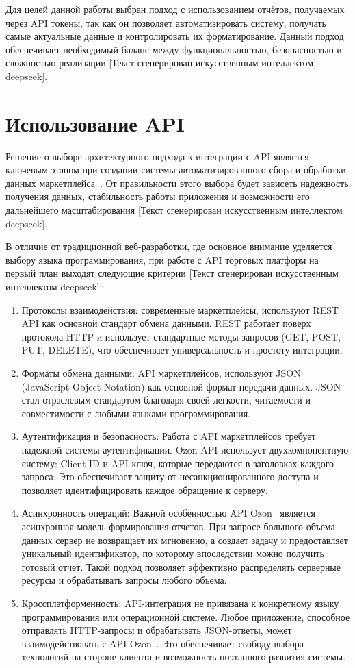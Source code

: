 Для целей данной работы выбран подход с использованием отчётов, получаемых через API токены, так как он позволяет автоматизировать систему, получать самые актуальные данные и контролировать их форматирование. Данный подход обеспечивает необходимый баланс между функциональностью, безопасностью и сложностью реализации [Текст сгенерирован искусственным интеллектом deepseek].

\section{Использование API}
Решение о выборе архитектурного подхода к интеграции с API является ключевым этапом при создании системы автоматизированного сбора и обработки данных маркетплейса~\cite{ozonapiAsync}. От правильности этого выбора будет зависеть надежность получения данных, стабильность работы приложения и возможности его дальнейшего масштабирования [Текст сгенерирован искусственным интеллектом deepseek].

В отличие от традиционной веб-разработки, где основное внимание уделяется выбору языка программирования, при работе с API торговых платформ на первый план выходят следующие критерии [Текст сгенерирован искусственным интеллектом deepseek]:
\begin{enumerate}
    \item Протоколы взаимодействия: современные маркетплейсы, используют REST API как основной стандарт обмена данными. REST работает поверх протокола HTTP и использует стандартные методы запросов (GET, POST, PUT, DELETE), что обеспечивает универсальность и простоту интеграции.
    \item Форматы обмена данными: API маркетплейсов, используют JSON (JavaScript Object Notation) как основной формат передачи данных. JSON стал отраслевым стандартом благодаря своей легкости, читаемости и совместимости с любыми языками программирования.
    \item Аутентификация и безопасность: Работа с API маркетплейсов требует надежной системы аутентификации. Ozon API использует двухкомпонентную систему: Client-ID и API-ключ, которые передаются в заголовках каждого запроса. Это обеспечивает защиту от несанкционированного доступа и позволяет идентифицировать каждое обращение к серверу.
    \item Асинхронность операций: Важной особенностью API Ozon~\cite{ozonapiAsync} является асинхронная модель формирования отчетов. При запросе большого объема данных сервер не возвращает их мгновенно, а создает задачу и предоставляет уникальный идентификатор, по которому впоследствии можно получить готовый отчет. Такой подход позволяет эффективно распределять серверные ресурсы и обрабатывать запросы любого объема.
    \item Кроссплатформенность: API-интеграция не привязана к конкретному языку программирования или операционной системе. Любое приложение, способное отправлять HTTP-запросы и обрабатывать JSON-ответы, может взаимодействовать с API Ozon~\cite{ozonapiAsync}. Это обеспечивает свободу выбора технологий на стороне клиента и возможность поэтапного развития системы.
\end{enumerate}

